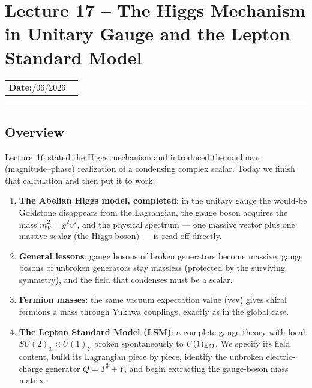 
\section{Lecture 17 -- The Higgs Mechanism in Unitary Gauge and the Lepton Standard Model}\label{sec:lec17}
\begin{center}
\begin{tabular}{ll}
  \textbf{Date:}\quad 11/06/2026 & \\
\end{tabular}
\end{center}
\hrule\vspace{1.5em}

\subsection{Overview}\label{subsec:lec17:overview}

Lecture~16 stated the Higgs mechanism and introduced the nonlinear (magnitude--phase) realization of a condensing complex scalar. Today we finish that calculation and then put it to work:

\begin{enumerate}
  \item \textbf{The Abelian Higgs model, completed}: in the unitary gauge the would-be Goldstone disappears from the Lagrangian, the gauge boson acquires the mass $m_V^2=g^2v^2$, and the physical spectrum --- one massive vector plus one massive scalar (the Higgs boson) --- is read off directly.
  \item \textbf{General lessons}: gauge bosons of broken generators become massive, gauge bosons of unbroken generators stay massless (protected by the surviving symmetry), and the field that condenses must be a scalar.
  \item \textbf{Fermion masses}: the same vacuum expectation value (vev) gives chiral fermions a mass through Yukawa couplings, exactly as in the global case.
  \item \textbf{The Lepton Standard Model (LSM)}: a complete gauge theory with local $SU(2)_L\times U(1)_Y$ broken spontaneously to $U(1)_{\rm EM}$. We specify its field content, build its Lagrangian piece by piece, identify the unbroken electric-charge generator $Q=T^3+Y$, and begin extracting the gauge-boson mass matrix.
\end{enumerate}

